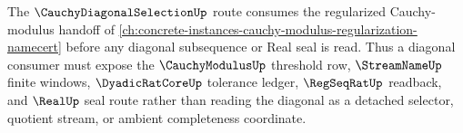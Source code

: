 The $\CauchyDiagonalSelectionUp$ route consumes the regularized Cauchy-modulus handoff of \autoref{ch:concrete-instances-cauchy-modulus-regularization-namecert} before any diagonal subsequence or Real seal is read. Thus a diagonal consumer must expose the $\CauchyModulusUp$ threshold row, $\StreamNameUp$ finite windows, $\DyadicRatCoreUp$ tolerance ledger, $\RegSeqRatUp$ readback, and $\RealUp$ seal route rather than reading the diagonal as a detached selector, quotient stream, or ambient completeness coordinate.
